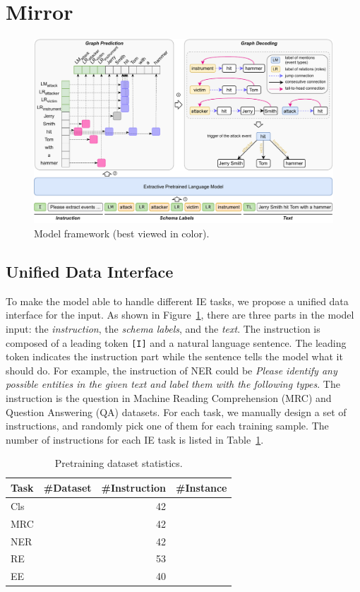 \section{Mirror}


\begin{figure}[t]
    \centering
    \includegraphics[width=\textwidth]{figs/Model Framework.pdf}
    \caption{Model framework (best viewed in color).}
    \label{fig:model-framework}
\end{figure}

\subsection{Unified Data Interface}

To make the model able to handle different IE tasks, we propose a unified data interface for the input.
As shown in Figure~\ref{fig:model-framework}, there are three parts in the model input: the \textit{instruction}, the \textit{schema labels}, and the \textit{text}.
The instruction is composed of a leading token \verb|[I]| and a natural language sentence.
The leading token indicates the instruction part while the sentence tells the model what it should do.
For example, the instruction of NER could be \textit{Please identify any possible entities in the given text and label them with the following types}.
The instruction is the question in Machine Reading Comprehension (MRC) and Question Answering (QA) datasets.
For each task, we manually design a set of instructions, and randomly pick one of them for each training sample.
The number of instructions for each IE task is listed in Table~\ref{tab:pretrain-dataset-statistics}.

\begin{table}[t]
    \centering
    \begin{tabular}{lrrr}
        \toprule
        Task & \#Dataset & \#Instruction & \#Instance \\
        \midrule
        Cls &  & 42 &  \\
        MRC &  & 42 &  \\
        NER &  & 42 &  \\
        RE &  & 53 &  \\
        EE &  & 40 &  \\
        \bottomrule
    \end{tabular}
    \caption{Pretraining dataset statistics.}
    \label{tab:pretrain-dataset-statistics}
\end{table}

